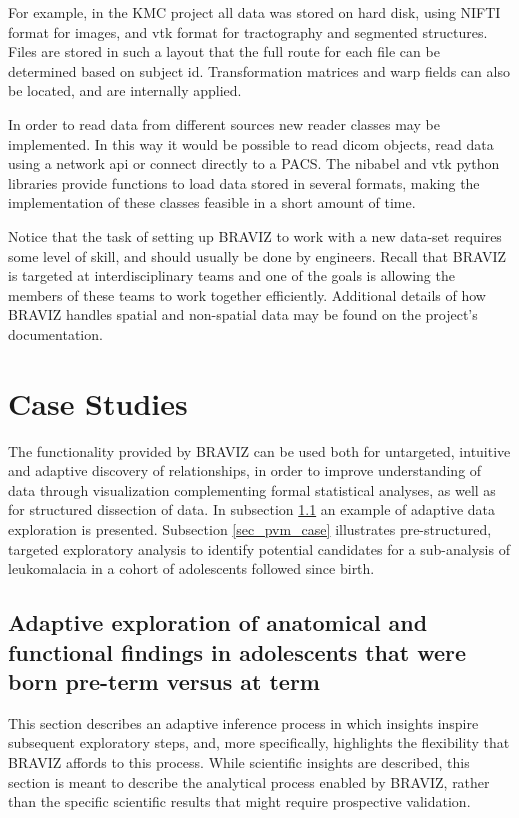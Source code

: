 \documentclass[twocolumn]{svjour3}
\begin{document}
For example, in the KMC project all data was stored on hard disk, using NIFTI format for images, and vtk format for tractography and segmented structures. Files are stored in such a layout that the full route for each file can be determined based on subject id. Transformation matrices and warp fields can also be located, and are internally applied.

In order to read data from different sources new reader classes may be implemented. In this way it would be possible to read dicom objects, read data using a network api or connect directly to a PACS. The nibabel and vtk python libraries provide functions to load data stored in several formats, making the implementation of these classes feasible in a short amount of time.

Notice that the task of setting up BRAVIZ to work with a new data-set requires some level of skill, and should usually be done by engineers. Recall that BRAVIZ is targeted at interdisciplinary teams and one of the goals is allowing the members of these teams to work together efficiently. Additional details of how BRAVIZ handles spatial and non-spatial data may be found on the project's documentation. 






\section{Case Studies}

The functionality provided by BRAVIZ can be used both for untargeted, intuitive and adaptive discovery of relationships, in order to improve understanding of data through visualization complementing formal statistical analyses, as well as for structured dissection of data. In subsection \ref{sec_case_cyril} an example of adaptive data exploration is presented. Subsection \ref{sec_pvm_case} illustrates pre-structured, targeted exploratory analysis to identify potential candidates for a sub-analysis of leukomalacia in a cohort of adolescents followed since birth. 
 
\subsection{Adaptive exploration of anatomical and functional findings in adolescents that were born pre-term versus at term}
\label{sec_case_cyril}

This section describes an adaptive inference process in which insights inspire subsequent exploratory steps, and, more specifically, highlights the flexibility that BRAVIZ affords to this process. While scientific insights are described, this section is meant to describe the analytical process enabled by BRAVIZ, rather than the specific scientific results that might require prospective validation.
\end{document}
